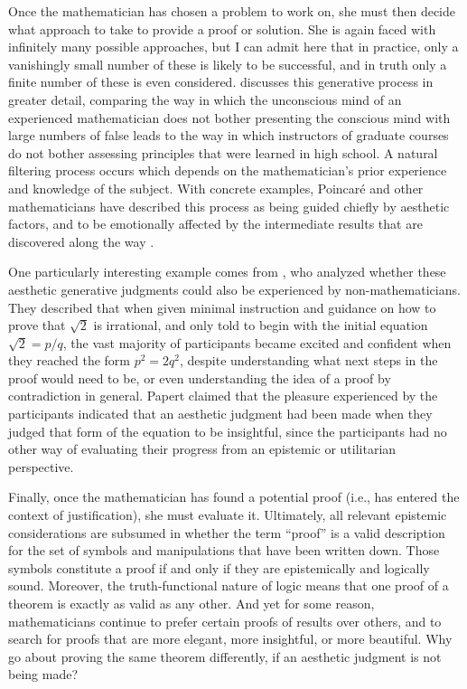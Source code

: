 \documentclass[a4paper,man,natbib]{apa6}
\begin{document}
Once the mathematician has chosen a problem to work on, she must then decide what approach to take to provide
a proof or solution. She is again faced with infinitely many possible approaches, but I can admit
here that in practice, only a vanishingly small number of these is likely to be successful, and in truth
only a finite number of these is even considered. \cite{poincare_mathematical_1910} discusses this generative 
process in greater detail, comparing the way in which the unconscious mind of an experienced mathematician does not
bother presenting the conscious mind with large numbers of false leads to the way in which instructors of graduate
courses do not bother assessing principles that were learned in high school.  A natural filtering process occurs
which depends on the mathematician's prior experience and knowledge of the subject. With concrete examples, 
Poincaré and other mathematicians have described this process as being guided chiefly by aesthetic factors, and to be 
emotionally affected by the intermediate results that are discovered along the way \citep{sinclair_roles_2004}.

One particularly interesting example comes from \citet{papert_mathematical_1978}, who analyzed whether
these aesthetic generative judgments could also be experienced by non-mathematicians. They described that when
given minimal instruction and guidance on how to prove that $\sqrt{2}$ is irrational, and only told to begin with
the initial equation $\sqrt{2}=p/q$, the vast majority of participants became excited and confident when they reached 
the form $p^2=2q^2$, despite understanding what next steps in the proof would need to be, or even understanding
the idea of a proof by contradiction in general. Papert claimed that the pleasure experienced by the participants
indicated that an aesthetic judgment had been made when they judged that form of the equation to be insightful, since 
the participants had no other way of evaluating their progress from an epistemic or utilitarian perspective.

Finally, once the mathematician has found a potential proof (i.e., has entered the context of justification), 
she must evaluate it. Ultimately, all relevant epistemic
considerations are subsumed in whether the term ``proof'' is a valid description for the set
of symbols and manipulations that have been written down. Those symbols constitute a proof if and only if they
are epistemically and logically sound. Moreover, the truth-functional nature of logic means that one proof
of a theorem is exactly as valid as any other. And yet for some reason, mathematicians continue to prefer certain
proofs of results over others, and to search for proofs that are more elegant, more insightful, or more beautiful.
Why go about proving the same theorem differently, if an aesthetic judgment is not being made?
\end{document}
